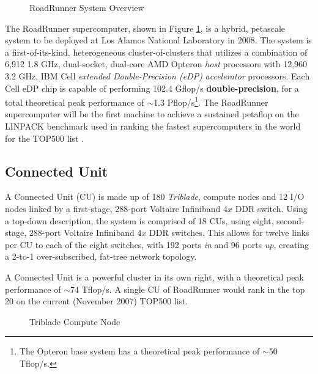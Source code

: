 \documentclass[letter,10pt]{article}
\begin{document}
\begin{figure}
    \begin{center}
    \scalebox{0.3}{}
    \caption{RoadRunner System Overview}
    \label{fig:system}
    \end{center}
\end{figure}

The RoadRunner supercomputer, shown in Figure \ref{fig:system}, is a hybrid, petascale system to be deployed at Los Alamos National Laboratory in 2008.  The system is a first-of-its-kind, heterogeneous cluster-of-clusters that utilizes a combination of 6,912 1.8 GHz, dual-socket, dual-core AMD Opteron \emph{host} processors with 12,960 3.2 GHz, IBM Cell \emph{extended Double-Precision (eDP)} \emph{accelerator} processors.  Each Cell eDP chip is capable of performing 102.4 Gflop/s \textbf{double-precision}, for a total theoretical peak performance of $\sim$1.3 Pflop/s\footnote{The Opteron base system has a theoretical peak performance of $\sim$50 Tflop/s.}.  The RoadRunner supercomputer will be the first machine to achieve a sustained petaflop on the LINPACK benchmark used in ranking the fastest supercomputers in the world for the TOP500 list \cite{top500}.

\subsection*{Connected Unit}

A Connected Unit (CU) is made up of 180 \emph{Triblade}, compute nodes and 12 I/O nodes linked by a first-stage, 288-port Voltaire Infiniband $4x$ DDR switch.  Using a top-down description, the system is comprised of 18 CUs, using eight, second-stage, 288-port Voltaire Infiniband $4x$ DDR switches.  This allows for twelve links per CU to each of the eight switches, with 192 ports \emph{in} and 96 ports \emph{up}, creating a 2-to-1 over-subscribed, fat-tree network topology.

A Connected Unit is a powerful cluster in its own right, with a theoretical peak performance of $\sim$74 Tflop/s.  A single CU of RoadRunner would rank in the top 20 on the current (November 2007) TOP500 list.

\begin{figure}
    \begin{center}
    \scalebox{0.4}{}
    \caption{Triblade Compute Node}
    \label{fig:triblade}
    \end{center}
\end{figure}
\end{document}
